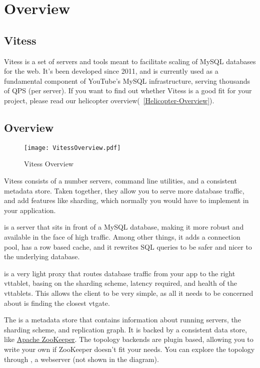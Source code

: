 \chapter{Overview}
\section{Vitess}\hypertarget{vitess}{}\label{vitess}

Vitess is a set of servers and tools meant to facilitate scaling of MySQL
databases for the web. It's been developed since 2011, and is currently used as
a fundamental component of YouTube's MySQL infrastructure, serving thousands of
QPS (per server). If you want to find out whether Vitess is a good fit for your
project, please read our helicopter overview(~\ref{Helicopter-Overview}).


\section{Overview}\hypertarget{overview}{}\label{overview}

\begin{figure}[H]
\caption{Vitess Overview}
\label{fig:VitessSpectrum}
\begin{center}
\texttt{[image: VitessOverview.pdf]}
\end{center}
\end{figure}


Vitess consists of a number servers, command line utilities, and a consistent
metadata store. Taken together, they allow you to serve more database traffic,
and add features like sharding, which normally you would have to implement in your
application.

 is a server that sits in front of a MySQL database, making it more
robust and available in the face of high traffic. Among other things, it adds a
connection pool, has a row based cache, and it rewrites SQL queries to be safer
and nicer to the underlying database.


 is a very light proxy that routes database traffic from your app to the
right vttablet, basing on the sharding scheme, latency required, and health of
the vttablets. This allows the client to be very simple, as all it needs to be
concerned about is finding the closest vtgate.

The  is a metadata store that contains information about running
servers, the sharding scheme, and replication graph. It is backed by a
consistent data store, like \href{http://zookeeper.apache.org/}{Apache ZooKeeper}.
The topology backends are plugin based, allowing you to write your own if
ZooKeeper doesn't fit your needs. You can explore the topology through
, a webserver (not shown in the diagram).

